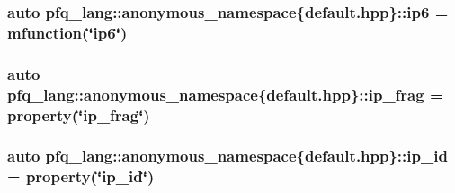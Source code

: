 \hypertarget{namespacepfq__lang_1_1anonymous__namespace_02default_8hpp_03_a566cbe8627dd2ae05071690ef64dbd12}{
\subsubsection[{ip6}]{\setlength{\rightskip}{0pt plus 5cm}auto pfq\+\_\+lang\+::anonymous\+\_\+namespace\{default.\+hpp\}\+::ip6 = {\bf mfunction}(\char`\"{}ip6\char`\"{})}}\label{namespacepfq__lang_1_1anonymous__namespace_02default_8hpp_03_a566cbe8627dd2ae05071690ef64dbd12}
\hypertarget{namespacepfq__lang_1_1anonymous__namespace_02default_8hpp_03_a29f207a5d209c3968f5d2e8f3c19c239}{
\subsubsection[{ip\+\_\+frag}]{\setlength{\rightskip}{0pt plus 5cm}auto pfq\+\_\+lang\+::anonymous\+\_\+namespace\{default.\+hpp\}\+::ip\+\_\+frag = {\bf property}(\char`\"{}ip\+\_\+frag\char`\"{})}}\label{namespacepfq__lang_1_1anonymous__namespace_02default_8hpp_03_a29f207a5d209c3968f5d2e8f3c19c239}
\hypertarget{namespacepfq__lang_1_1anonymous__namespace_02default_8hpp_03_a7e1fd2e2131451ca8afe2f8ab07b97a8}{
\subsubsection[{ip\+\_\+id}]{\setlength{\rightskip}{0pt plus 5cm}auto pfq\+\_\+lang\+::anonymous\+\_\+namespace\{default.\+hpp\}\+::ip\+\_\+id = {\bf property}(\char`\"{}ip\+\_\+id\char`\"{})}}\label{namespacepfq__lang_1_1anonymous__namespace_02default_8hpp_03_a7e1fd2e2131451ca8afe2f8ab07b97a8}
